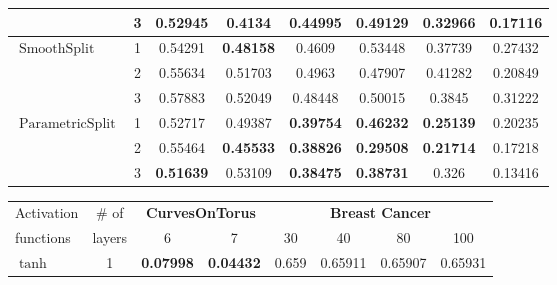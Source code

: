 \documentclass{esannV2}
\DeclareMathOperator{\smoothsplit}{\mathrm{SmoothSplit}}
\DeclareMathOperator{\parametricsplit}{\mathrm{ParametricSplit}}
\begin{document}
\begin{table}[ht]
\begin{tabular}{|l|c|ccc|ccc|}
                       & 3                          & 0.52945                               & \textbf{0.4134}                             & 0.44995          & 0.49129          & 0.32966          & 0.17116          \\
    \hline
    $\smoothsplit$     & 1                          & 0.54291                               & \textbf{0.48158}                            & 0.4609           & 0.53448          & 0.37739          & 0.27432          \\
                       & 2                          & 0.55634                               & 0.51703                                     & 0.4963           & 0.47907          & 0.41282          & 0.20849          \\
                       & 3                          & 0.57883                               & 0.52049                                     & 0.48448          & 0.50015          & 0.3845           & 0.31222          \\
    \hline
    $\parametricsplit$ & 1                          & 0.52717                               & 0.49387                                     & \textbf{0.39754} & \textbf{0.46232} & \textbf{0.25139} & 0.20235          \\
                       & 2                          & 0.55464                               & \textbf{0.45533}                            & \textbf{0.38826} & \textbf{0.29508} & \textbf{0.21714} & 0.17218          \\
                       & 3                          & \textbf{0.51639}                      & 0.53109                                     & \textbf{0.38475} & \textbf{0.38731} & 0.326            & 0.13416          \\
    \hline
  \end{tabular}
  \begin{tabular}{|l|c|cc|cccc|}
    \hline
    Activation         & \multicolumn{1}{c|}{\# of} & \multicolumn{2}{c|}{\textbf{CurvesOnTorus}} & \multicolumn{4}{c|}{\textbf{Breast Cancer}}                                                                             \\
    functions          & layers                     & 6                                           & 7                                           & 30               & 40               & 80               & 100              \\
    \hline
    $\tanh$            & 1                          & \textbf{0.07998}                            & \textbf{0.04432}                            & 0.659            & 0.65911          & 0.65907          & 0.65931          \\

\end{tabular}
\end{table}
\end{document}
